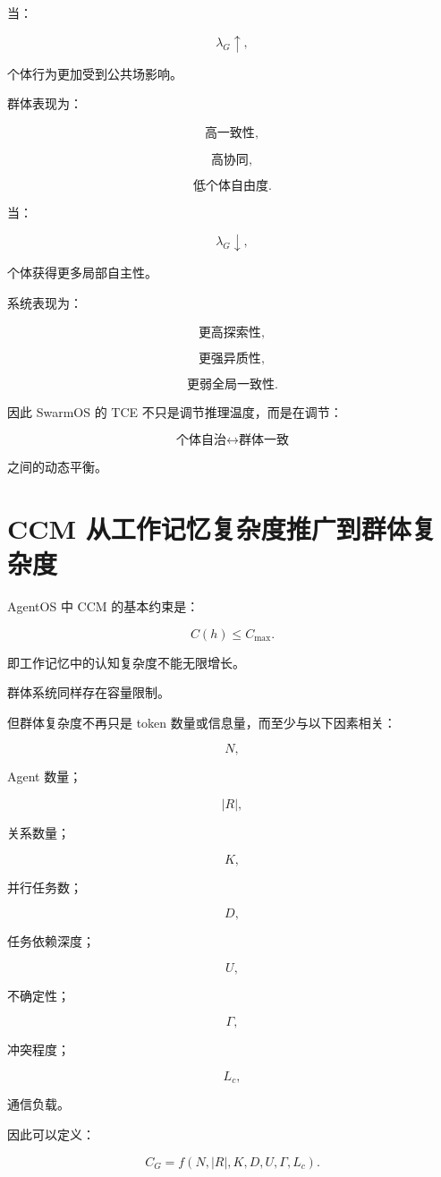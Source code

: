 当：

\[
\lambda_G
\uparrow,
\]

个体行为更加受到公共场影响。

群体表现为：

\[
\text{高一致性},
\]

\[
\text{高协同},
\]

\[
\text{低个体自由度}.
\]

当：

\[
\lambda_G
\downarrow,
\]

个体获得更多局部自主性。

系统表现为：

\[
\text{更高探索性},
\]

\[
\text{更强异质性},
\]

\[
\text{更弱全局一致性}.
\]

因此 SwarmOS 的 TCE 不只是调节推理温度，而是在调节：

\[
\boxed{
\text{个体自治}
\leftrightarrow
\text{群体一致}
}
\]

之间的动态平衡。


\section{CCM 从工作记忆复杂度推广到群体复杂度}

AgentOS 中 CCM 的基本约束是：

\[
C(h)
\leq
C_{\max}.
\]

即工作记忆中的认知复杂度不能无限增长。

群体系统同样存在容量限制。

但群体复杂度不再只是 token 数量或信息量，而至少与以下因素相关：

\[
N,
\]

Agent 数量；

\[
|R|,
\]

关系数量；

\[
K,
\]

并行任务数；

\[
D,
\]

任务依赖深度；

\[
U,
\]

不确定性；

\[
\Gamma,
\]

冲突程度；

\[
L_c,
\]

通信负载。

因此可以定义：

\[
C_G
=
f
\left(
N,
|R|,
K,
D,
U,
\Gamma,
L_c
\right).
\]

